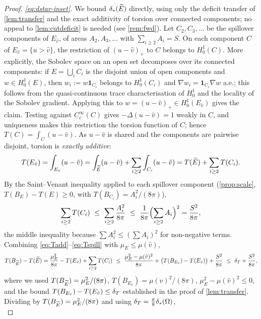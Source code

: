 \begin{proof}
\emph{\eqref{eq:dstar-inset}.} We bound $\delta_{*}(\widetilde{E})$ directly, using only
the deficit transfer of \cref{lem:transfer} and the exact additivity of
torsion over connected components; no appeal to \cref{lem:cutdeficit} is
needed (see \cref{rem:fwd}). Let $C_2,C_3,\dots$ be the spillover components
of $E_{\hat v}$, of areas $A_2,A_3,\dots$ with $\sum_{i\ge2}A_i=S$. On each
component $C$ of $E_{\hat v}=\{u>\hat v\}$, the restriction of
$(u-\hat v)_+$ to $C$ belongs to $H^1_0(C)$.  More explicitly, the Sobolev
space on an open set decomposes over its connected components:
if $E=\bigcup_i C_i$ is the disjoint union of open components and
$w\in H^1_0(E)$, then $w_i:=w\mathbf1_{C_i}$ belongs to $H^1_0(C_i)$ and
$\nabla w_i=\mathbf1_{C_i}\nabla w$ a.e.; this follows from the
quasi-continuous trace characterisation of $H^1_0$ and the locality of the
Sobolev gradient.  Applying this to $w=(u-\hat v)_+\in H^1_0(E_{\hat v})$
gives the claim.  Testing against $C_c^\infty(C)$ gives
$-\Delta(u-\hat v)=1$ weakly in $C$, and uniqueness makes this restriction
the torsion function of $C$; hence $T(C)=\int_C(u-\hat v)$. As
$u-\hat v$ is shared and the components are pairwise disjoint, torsion is
\emph{exactly additive}:
\begin{equation}\label{eq:Tadd}
   T(E_{\hat v})=\int_{E_{\hat v}}(u-\hat v)
   =\int_{\widetilde{E}}(u-\hat v)+\sum_{i\ge2}\int_{C_i}(u-\hat v)
   =T(\widetilde{E})+\sum_{i\ge2}T(C_i).
\end{equation}
By the Saint--Venant inequality applied to each spillover component
(\cref{prop:scale}, $T(B_E)-T(E)\ge0$, with $T(B_{C_i})=A_i^2/(8\pi)$),
\begin{equation}\label{eq:Tspill}
   \sum_{i\ge2}T(C_i)\ \le\ \sum_{i\ge2}\frac{A_i^2}{8\pi}
   \ \le\ \frac{1}{8\pi}\Bigl(\sum_{i\ge2}A_i\Bigr)^2=\frac{S^2}{8\pi},
\end{equation}
the middle inequality because $\sum A_i^2\le(\sum A_i)^2$ for non-negative
terms. Combining \eqref{eq:Tadd}--\eqref{eq:Tspill} with $\mu_E\le\mu(\hat
v)$,
\[
   T(B_{\widetilde{E}})-T(\widetilde{E})
   =\frac{\mu_E^2}{8\pi}-T(E_{\hat v})+\sum_{i\ge2}T(C_i)
   \ \le\ \frac{\mu_E^2-\mu(\hat v)^2}{8\pi}
          +\bigl(T(B_{E_{\hat v}})-T(E_{\hat v})\bigr)+\frac{S^2}{8\pi}
   \ \le\ \delta_T+\frac{S^2}{8\pi},
\]
where we used $T(B_{\widetilde{E}})=\mu_E^2/(8\pi)$, $T(B_{E_{\hat v}})=
\mu(\hat v)^2/(8\pi)$, $\mu_E^2-\mu(\hat v)^2\le0$, and the bound
$T(B_{E_{\hat v}})-T(E_{\hat v})\le\delta_T$ established in the proof of
\cref{lem:transfer}. Dividing by $T(B_{\widetilde{E}})=\mu_E^2/(8\pi)$ and using
$\delta_T=\tfrac\pi8\delta_{*}(\Omega)$,
\begin{equation}\label{eq:dstarE-exact}

\end{equation}
\end{proof}
